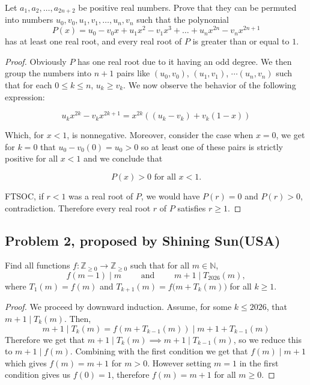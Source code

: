 \documentclass[11pt]{scrartcl}
\begin{document}
\begin{problem}
    Let $a_1,a_2,\dots,a_{2n+2}$ be positive real numbers. Prove that they can be permuted into numbers $u_0,v_0,u_1,v_1,\dots,u_n,v_n$ such that 
    the polynomial
    $$P(x)=u_0-v_0x+u_1x^2-v_1x^3+\dots+u_nx^{2n}-v_nx^{2n+1}$$
    has at least one real root, and every real root of $P$ is greater than or equal to $1$.
\end{problem}

\begin{proof}
    Obviously $P$ has one real root due to it having an odd degree. We then group the numbers into $n+1$ pairs like
    $(u_0, v_0)$, $(u_1, v_1)$, $\cdots (u_n, v_n)$ such that for each $0 \le k \le n$, $u_k \ge v_k$. We now observe the behavior of the
    following expression:

    \[
        u_kx^{2k} - v_kx^{2k+1} = x^{2k}((u_k-v_k)+v_k(1-x))
    \]

    Which, for $x<1$, is nonnegative. Moreover, consider the case when $x=0$, we get for $k=0$ that $u_0 - v_0(0) = u_0 > 0$ so
    at least one of these pairs is strictly positive for all $x<1$ and we conclude that

    \[
    P(x) > 0 \text{ for all } x < 1.
    \]

    FTSOC, if $r<1$ was a real root of $P$, we would have $P(r)=0$ and $P(r)>0$, contradiction. Therefore every real root $r$ of $P$ satisfies
    $r \ge 1$.
\end{proof}

\newpage{}

\subsection{Problem 2, proposed by Shining Sun(USA)}

\begin{problem}
    Find all functions $f:\mathbb{Z}_{\ge 0}\to\mathbb{Z}_{\ge 0}$ such that for all 
    $m\in\mathbb{N}$,$$f(m-1)\mid m \qquad \text{ and } \qquad m+1 \mid T_{2026}(m),
    $$where $T_1(m)=f(m)$ and $T_{k+1}(m)=f\bigl(m+T_k(m)\bigr)$ for all $k\ge 1$.
\end{problem}

\begin{proof}
    We proceed by downward induction. Assume, for some $k \le 2026$, that $m+1 \mid T_k(m)$. Then,
    \[
    m+1 \mid T_k(m) = f(m+T_{k-1}(m)) \mid m+1+T_{k-1}(m)
    \]
    Therefore we get that $m+1 \mid T_k(m) \implies m+1 \mid T_{k-1}(m)$, so we reduce this to $m+1 \mid f(m)$. Combining
    with the first condition we get that $f(m) \mid m+1$ which gives $f(m) = m+1$ for $m>0$. However setting $m=1$ in the first
    condition gives us $f(0) = 1$, therefore $f(m) = m+1$ for all $m\ge0$.
\end{proof}
\end{document}
